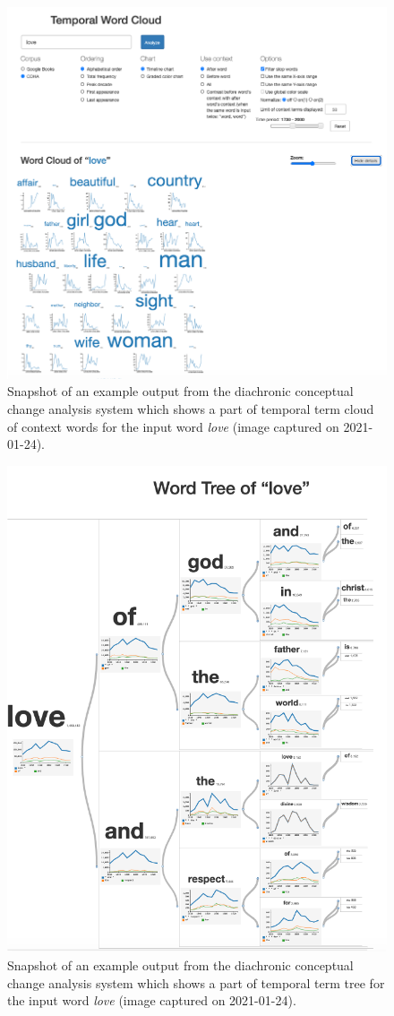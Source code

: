 \documentclass[output=paper]{langsci/langscibook}
\begin{document}
\begin{figure}
	\includegraphics[width=\textwidth]{figures/JATOWT_jatowt2.png}
        \caption{Snapshot of an example output from the diachronic conceptual change analysis system which shows a part of temporal term cloud of context words for the input word \textit{love} (image captured on 2021-01-24).\label{fig:jatowt2}}
\end{figure}

\begin{figure}
	\includegraphics[width=.75\textwidth]{figures/JATOWT_jatowt3.png}
        \caption{Snapshot of an example output from the diachronic conceptual change analysis system which shows a part of temporal term tree for the input word \textit{love} (image captured on 2021-01-24).\label{fig:jatowt3}}
\end{figure}
\end{document}
